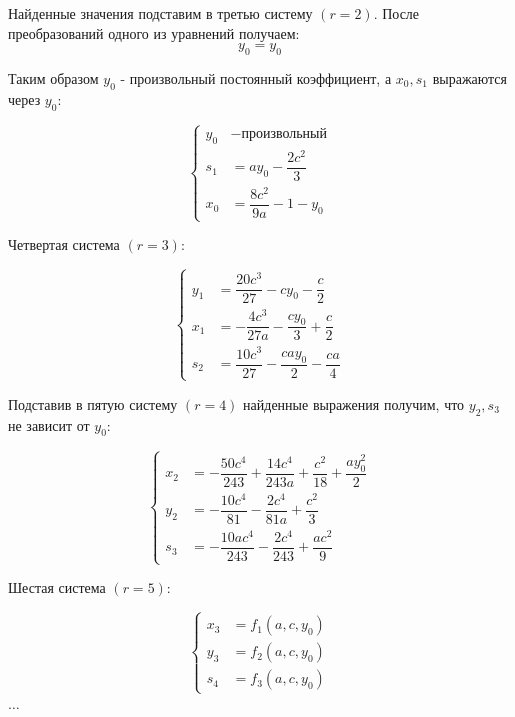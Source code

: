 Найденные значения подставим в третью систему $ (r = 2) $. После преобразований одного из уравнений получаем:
$$ 
	y_0 = y_0
$$ 

Таким образом $ y_0 $ - произвольный постоянный коэффициент, а $ x_0, s_1 $ выражаются через $ y_0 $:

$$
\left\{
	\begin{aligned}
		y_{0} &- \text{произвольный} \\
		s_{1} &= ay_0 - \dfrac{2c^2}{3} \\
		x_{0} &= \dfrac{8c^2}{9a} - 1 - y_0
	\end{aligned}
\right.
$$

Четвертая система $ (r = 3) $:

$$
\left\{
	\begin{aligned}
		y_1 &= \dfrac{20c^3}{27} - cy_0 - \dfrac{c}{2} \\
		x_1 &= -\dfrac{4c^3}{27a} - \dfrac{cy_0}{3} + \dfrac{c}{2} \\
		s_2 &= \dfrac{10c^3}{27} - \dfrac{cay_0}{2} - \dfrac{ca}{4}
	\end{aligned}
\right.
$$

Подставив в пятую систему $ (r = 4) $ найденные выражения получим, что $ y_2,s_3 $ не зависит от $ y_0 $:

$$
\left\{
	\begin{aligned}
		x_2 &= -\dfrac{50c^4}{243} + \dfrac{14c^4}{243a} + \dfrac{c^2}{18} + \dfrac{ay^2_0}{2}\\
		y_2 &= -\dfrac{10c^4}{81} - \dfrac{2c^4}{81a} + \dfrac{c^2}{3} \\
		s_3 &= -\dfrac{10ac^4}{243} - \dfrac{2c^4}{243} + \dfrac{ac^2}{9}
	\end{aligned}
\right.
$$

Шестая система $ (r = 5) $:

$$
\left\{
	\begin{aligned}
		x_3 &= f_1(a,c,y_0) \\
		y_3 &= f_2(a,c,y_0) \\
		s_4 &= f_3(a,c,y_0)
	\end{aligned}
\right.
$$

\begin{center}
	$ \ldots $
\end{center}